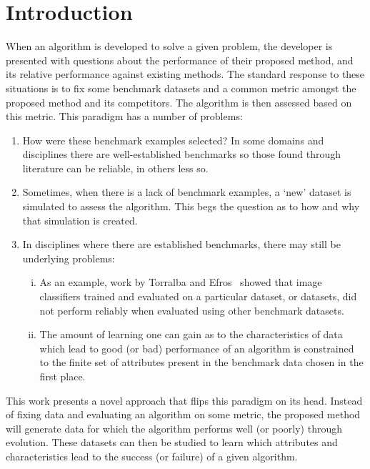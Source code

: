 \section{Introduction}\label{section:introduction}

When an algorithm is developed to solve a given problem, the developer is
presented with questions about the performance of their proposed method, and its
relative performance against existing methods. The standard response to these
situations is to fix some benchmark datasets and a common metric amongst the
proposed method and its competitors. The algorithm is then assessed based on
this metric. This paradigm has a number of problems:

\begin{enumerate}
    \item How were these benchmark examples selected? In some domains and
        disciplines there are well-established benchmarks so those found through
        literature can be reliable, in others less so.
    \item Sometimes, when there is a lack of benchmark examples, a `new' dataset
        is simulated to assess the algorithm. This begs the question as to how
        and why that simulation is created.
    \item In disciplines where there are established benchmarks, there may still
        be underlying problems:
        \begin{enumerate}[(i)]
            \item As an example, work by Torralba and Efros~\cite{Torralba2011}
                showed that image classifiers trained and evaluated on a
                particular dataset, or datasets, did not perform reliably when
                evaluated using other benchmark datasets.
            \item The amount of learning one can gain as to the characteristics
                of data which lead to good (or bad) performance of an algorithm
                is constrained to the finite set of attributes present in the
                benchmark data chosen in the first place.
        \end{enumerate}
\end{enumerate}

This work presents a novel approach that flips this paradigm on its head.
Instead of fixing data and evaluating an algorithm on some metric, the proposed
method will generate data for which the algorithm performs well (or poorly)
through evolution. These datasets can then be studied to learn which attributes
and characteristics lead to the success (or failure) of a given algorithm.

